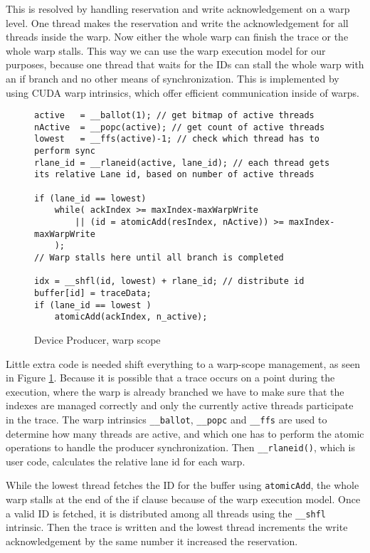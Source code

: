 	This is resolved by handling reservation and write acknowledgement on a warp level. One thread makes the reservation and write the acknowledgement for all threads inside the warp. Now either the whole warp can finish the trace or the whole warp stalls. This way we can use the warp execution model for our purposes, because one thread that waits for the IDs can stall the whole warp with an if branch and no other means of synchronization. This is implemented by using CUDA warp intrinsics, which offer efficient communication inside of warps.
\begin{figure}[t]
	\begin{lstlisting}[style=C]
active   = __ballot(1); // get bitmap of active threads 
nActive  = __popc(active); // get count of active threads
lowest   = __ffs(active)-1; // check which thread has to perform sync
rlane_id = __rlaneid(active, lane_id); // each thread gets its relative Lane id, based on number of active threads
	
if (lane_id == lowest)
	while( ackIndex >= maxIndex-maxWarpWrite 
		|| (id = atomicAdd(resIndex, nActive)) >= maxIndex-maxWarpWrite
	);
// Warp stalls here until all branch is completed

idx = __shfl(id, lowest) + rlane_id; // distribute id
buffer[id] = traceData;
if (lane_id == lowest )
	atomicAdd(ackIndex, n_active);\end{lstlisting}
	\caption{Device Producer, warp scope}
	\label{prod-cons-warp}	
\end{figure}
	Little extra code is needed shift everything to a warp-scope management, as seen in Figure \ref{prod-cons-warp}. Because it is possible that a trace occurs on a point during the execution, where the warp is already branched we have to make sure
	that the indexes are managed correctly and only the currently active threads participate in the trace. The warp intrinsics \verb|__ballot|, \verb|__popc| and \verb|__ffs| are used to determine how many threads are active, and which one has to perform the atomic operations to handle
	the producer synchronization. Then \verb|__rlaneid()|, which is user code, calculates the relative lane id for each warp. 

	While the lowest thread fetches the ID for the buffer using \verb|atomicAdd|, the whole warp stalls at the end of the if clause because of the warp execution model. Once a valid ID is fetched, it is distributed among all threads using the \verb|__shfl| intrinsic. 	Then the trace is written and the lowest thread increments the write acknowledgement by the same number it increased the reservation.
	
